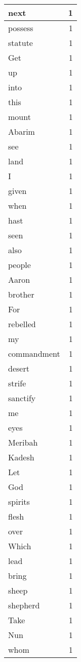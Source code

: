 \begin{center}
\begin{longtable}{l|r}
next & 1\\ \hline 
possess & 1\\ \hline 
statute & 1\\ \hline 
Get & 1\\ \hline 
up & 1\\ \hline 
into & 1\\ \hline 
this & 1\\ \hline 
mount & 1\\ \hline 
Abarim & 1\\ \hline 
see & 1\\ \hline 
land & 1\\ \hline 
I & 1\\ \hline 
given & 1\\ \hline 
when & 1\\ \hline 
hast & 1\\ \hline 
seen & 1\\ \hline 
also & 1\\ \hline 
people & 1\\ \hline 
Aaron & 1\\ \hline 
brother & 1\\ \hline 
For & 1\\ \hline 
rebelled & 1\\ \hline 
my & 1\\ \hline 
commandment & 1\\ \hline 
desert & 1\\ \hline 
strife & 1\\ \hline 
sanctify & 1\\ \hline 
me & 1\\ \hline 
eyes & 1\\ \hline 
Meribah & 1\\ \hline 
Kadesh & 1\\ \hline 
Let & 1\\ \hline 
God & 1\\ \hline 
spirits & 1\\ \hline 
flesh & 1\\ \hline 
over & 1\\ \hline 
Which & 1\\ \hline 
lead & 1\\ \hline 
bring & 1\\ \hline 
sheep & 1\\ \hline 
shepherd & 1\\ \hline 
Take & 1\\ \hline 
Nun & 1\\ \hline 
whom & 1\\ \hline 

\end{longtable}
\end{center}
